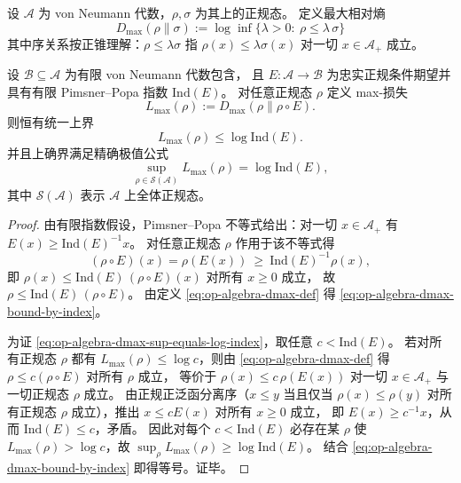\begin{definition}\label{def:op-algebra-max-relative-entropy}
设 \(\mathcal{A}\) 为 von Neumann 代数，\(\rho,\sigma\) 为其上的正规态。
定义最大相对熵
\begin{equation}\label{eq:op-algebra-dmax-def}
\boxed{\;
D_{\max}(\rho\|\sigma)
:=\log\inf\{\lambda>0:\ \rho\le \lambda\,\sigma\}\;}
\end{equation}
其中序关系按正锥理解：\(\rho\le \lambda\sigma\) 指 \(\rho(x)\le \lambda\sigma(x)\) 对一切 \(x\in\mathcal{A}_+\) 成立。
\end{definition}

\begin{proposition}\label{prop:op-algebra-dmax-capacity-equals-log-index}
设 \(\mathcal{B}\subseteq\mathcal{A}\) 为有限 von Neumann 代数包含，
且 \(E:\mathcal{A}\to\mathcal{B}\) 为忠实正规条件期望并具有有限 Pimsner--Popa 指数 \(\mathrm{Ind}(E)\)。
对任意正规态 \(\rho\) 定义 max-损失
\[
L_{\max}(\rho):=D_{\max}(\rho\|\rho\!\circ\!E).
\]
则恒有统一上界
\begin{equation}\label{eq:op-algebra-dmax-bound-by-index}
\boxed{\;
L_{\max}(\rho)\le \log\mathrm{Ind}(E).\;}
\end{equation}
并且上确界满足精确极值公式
\begin{equation}\label{eq:op-algebra-dmax-sup-equals-log-index}
\boxed{\;
\sup_{\rho\in\mathcal{S}(\mathcal{A})}L_{\max}(\rho)=\log\mathrm{Ind}(E),\;}
\end{equation}
其中 \(\mathcal{S}(\mathcal{A})\) 表示 \(\mathcal{A}\) 上全体正规态。
\end{proposition}
\begin{proof}
由有限指数假设，Pimsner--Popa 不等式给出：对一切 \(x\in\mathcal{A}_+\) 有
\(
E(x)\ge \mathrm{Ind}(E)^{-1}x
\)。
对任意正规态 \(\rho\) 作用于该不等式得
\[
(\rho\!\circ\!E)(x)=\rho(E(x))\ \ge\ \mathrm{Ind}(E)^{-1}\rho(x),
\]
即 \(\rho(x)\le \mathrm{Ind}(E)\,(\rho\!\circ\!E)(x)\) 对所有 \(x\ge0\) 成立，
故 \(\rho\le \mathrm{Ind}(E)\,(\rho\!\circ\!E)\)。
由定义 \eqref{eq:op-algebra-dmax-def} 得 \eqref{eq:op-algebra-dmax-bound-by-index}。
\par
为证 \eqref{eq:op-algebra-dmax-sup-equals-log-index}，取任意 \(c<\mathrm{Ind}(E)\)。
若对所有正规态 \(\rho\) 都有 \(L_{\max}(\rho)\le \log c\)，则由 \eqref{eq:op-algebra-dmax-def} 得 \(\rho\le c(\rho\!\circ\!E)\) 对所有 \(\rho\) 成立，
等价于 \(\rho(x)\le c\,\rho(E(x))\) 对一切 \(x\in\mathcal{A}_+\) 与一切正规态 \(\rho\) 成立。
由正规正泛函分离序（\(x\le y\) 当且仅当 \(\rho(x)\le \rho(y)\) 对所有正规态 \(\rho\) 成立），推出 \(x\le cE(x)\) 对所有 \(x\ge0\) 成立，
即 \(E(x)\ge c^{-1}x\)，从而 \(\mathrm{Ind}(E)\le c\)，矛盾。
因此对每个 \(c<\mathrm{Ind}(E)\) 必存在某 \(\rho\) 使 \(L_{\max}(\rho)>\log c\)，故
\(\sup_{\rho}L_{\max}(\rho)\ge \log\mathrm{Ind}(E)\)。
结合 \eqref{eq:op-algebra-dmax-bound-by-index} 即得等号。证毕。
\end{proof}

